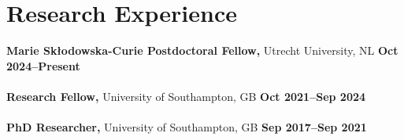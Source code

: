 \section{Research Experience}

%

\textbf{Marie Sk{\l}odowska-Curie Postdoctoral Fellow,} Utrecht University, NL
\hfill \textbf{Oct 2024--Present} \\
\\
\textbf{Research Fellow,} University of Southampton, GB
\hfill \textbf{Oct 2021--Sep 2024} \\
\\
\textbf{PhD Researcher,} University of Southampton, GB
\hfill \textbf{Sep 2017--Sep 2021} %


